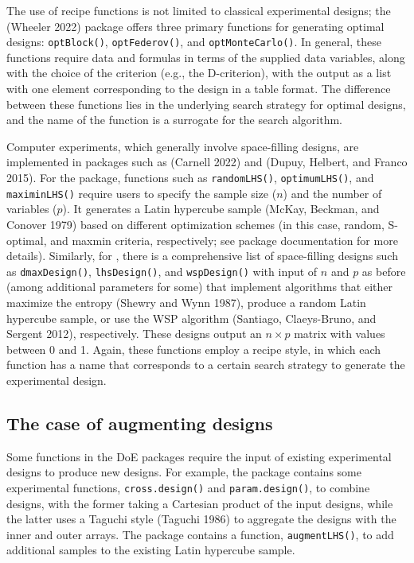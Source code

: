 The use of recipe functions is not limited to classical experimental designs; the  (Wheeler 2022) package offers three primary functions for generating optimal designs: \texttt{optBlock()}, \texttt{optFederov()}, and \texttt{optMonteCarlo()}. In general, these functions require data and formulas in terms of the supplied data variables, along with the choice of the criterion (e.g., the D-criterion), with the output as a list with one element corresponding to the design in a table format. The difference between these functions lies in the underlying search strategy for optimal designs, and the name of the function is a surrogate for the search algorithm.

Computer experiments, which generally involve space-filling designs, are implemented in packages such as  (Carnell 2022) and  (Dupuy, Helbert, and Franco 2015). For the  package, functions such as \texttt{randomLHS()}, \texttt{optimumLHS()}, and \texttt{maximinLHS()} require users to specify the sample size (\(n\)) and the number of variables (\(p\)). It generates a Latin hypercube sample (McKay, Beckman, and Conover 1979) based on different optimization schemes (in this case, random, S-optimal, and maxmin criteria, respectively; see package documentation for more details). Similarly, for , there is a comprehensive list of space-filling designs such as \texttt{dmaxDesign()}, \texttt{lhsDesign()}, and \texttt{wspDesign()} with input of \(n\) and \(p\) as before (among additional parameters for some) that implement algorithms that either maximize the entropy (Shewry and Wynn 1987), produce a random Latin hypercube sample, or use the WSP algorithm (Santiago, Claeys-Bruno, and Sergent 2012), respectively. These designs output an \(n \times p\) matrix with values between 0 and 1. Again, these functions employ a recipe style, in which each function has a name that corresponds to a certain search strategy to generate the experimental design.

\hypertarget{the-case-of-augmenting-designs}{%
\subsection{The case of augmenting designs}\label{the-case-of-augmenting-designs}}

Some functions in the DoE packages require the input of existing experimental designs to produce new designs. For example, the  package contains some experimental functions, \texttt{cross.design()} and \texttt{param.design()}, to combine designs, with the former taking a Cartesian product of the input designs, while the latter uses a Taguchi style (Taguchi 1986) to aggregate the designs with the inner and outer arrays. The  package contains a function, \texttt{augmentLHS()}, to add additional samples to the existing Latin hypercube sample.

